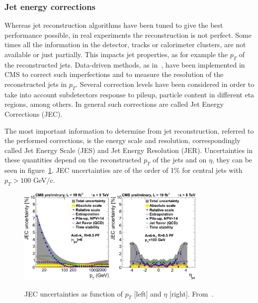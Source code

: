 \subsubsection{Jet energy corrections}

Whereas jet reconstruction algorithms have been tuned to give the best performance possible, in real experiments the reconstruction is not perfect. Some times all the information in the detector, tracks or calorimeter clusters, are not available or just partially. This impacts jet properties, as for example the $p_{T}$ of the reconstructed jets. Data-driven methods, as in~\cite{2011JInst...611002C}, have been implemented in CMS to correct such imperfections and to measure the resolution of the reconstructed jets in $p_{T}$. Several correction levels have been considered in order to take into account subdetectors response to pileup, particle content in different eta regions, among others. In general such corrections are called Jet Energy Corrections (JEC). 

The most important information to determine from jet reconstruction, referred to the performed corrections, is the energy scale and resolution, correspondingly called Jet Energy Scale (JES) and Jet Energy Resolution (JER). Uncertainties in these quantities depend on the reconstructed $p_{T}$ of the jets and on $\eta$, they can be seen in figure~\ref{fig:JEC}. JEC uncertainties are of the order of 1\% for central jets with $p_{T}>100$ GeV/c.

\begin{figure}[!Hhtbp]
  \begin{center}
    \includegraphics[width=0.4\textwidth]{figs/JEC_pt.png}
    \includegraphics[width=0.4\textwidth]{figs/JEC_eta.png}
    \caption{JEC uncertainties as function of $p_{T}$ [left] and $\eta$ [right]. From~\cite{Brochet:1956723}.}
    \label{fig:JEC}
  \end{center}
\end{figure}

